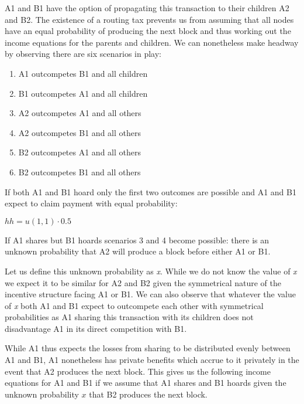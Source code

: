 \documentclass[oneside]{article}   	%
\begin{document}
\begin{multicols}{2}
A1 and B1 have the option of propagating this transaction to their children A2 and B2. The existence of a routing tax prevents us from assuming that all nodes have an equal probability of producing the next block and thus working out the income equations for the parents and children. We can nonetheless make headway by observing there are six scenarios in play:

\begin{enumerate}
  \item A1 outcompetes B1 and all children
  \item B1 outcompetes A1 and all children
  \item A2 outcompetes A1 and all others
  \item A2 outcompetes B1 and all others
  \item B2 outcompetes A1 and all others
  \item B2 outcompetes B1 and all others
\end{enumerate}

If both A1 and B1 hoard only the first two outcomes are possible and A1 and B1 expect to claim payment with equal probability:

\large
\begin{adjustwidth}{1.5em}{1.5em} 
	\begin{math}
h h = u(1, 1) \cdot 0.5
	\end{math}
\end{adjustwidth}
\normalsize

If A1 shares but B1 hoards scenarios 3 and 4 become possible: there is an unknown probability that A2 will produce a block before either A1 or B1.

Let us define this unknown probability as \textit{x}. While we do not know the value of \textit{x} we expect it to be similar for A2 and B2 given the symmetrical nature of the incentive structure facing A1 or B1. We can also observe that whatever the value of \textit{x} both A1 and B1 expect to outcompete each other with symmetrical probabilities as A1 sharing this transaction with its children does not disadvantage A1 in its direct competition with B1.

While A1 thus expects the losses from sharing to be distributed evenly between A1 and B1, A1 nonetheless has private benefits which accrue to it privately in the event that A2 produces the next block. This gives us the following income equations for A1 and B1 if we assume that A1 shares and B1 hoards given the unknown probability \begin{math}x\end{math} that B2 produces the next block.


\end{multicols}
\end{document}
